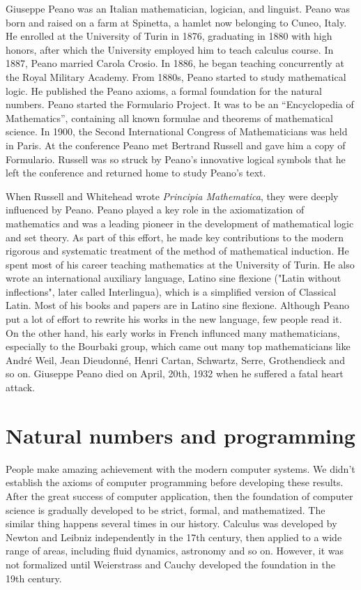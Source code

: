 \documentclass[b5paper]{article}
\begin{document}
Giuseppe Peano was an Italian mathematician, logician, and linguist. Peano was born and raised on a farm at Spinetta, a hamlet now belonging to Cuneo, Italy. He enrolled at the University of Turin in 1876, graduating in 1880 with high honors, after which the University employed him to teach calculus course. In 1887, Peano married Carola Crosio. In 1886, he began teaching concurrently at the Royal Military Academy. From 1880s, Peano started to study mathematical logic. He published the Peano axioms, a formal foundation for the natural numbers. Peano started the Formulario Project. It was to be an ``Encyclopedia of Mathematics'', containing all known formulae and theorems of mathematical science. In 1900, the Second International Congress of Mathematicians was held in Paris. At the conference Peano met Bertrand Russell and gave him a copy of Formulario. Russell was so struck by Peano's innovative logical symbols that he left the conference and returned home to study Peano's text\cite{M-Kline-2007}.

When Russell and Whitehead wrote {\em Principia Mathematica}, they were deeply influenced by Peano. Peano played a key role in the axiomatization of mathematics and was a leading pioneer in the development of mathematical logic and set theory. As part of this effort, he made key contributions to the modern rigorous and systematic treatment of the method of mathematical induction. He spent most of his career teaching mathematics at the University of Turin. He also wrote an international auxiliary language, Latino sine flexione ("Latin without inflections", later called Interlingua), which is a simplified version of Classical Latin. Most of his books and papers are in Latino sine flexione. Although Peano put a lot of effort to rewrite his works in the new language, few people read it. On the other hand, his early works in French influnced many mathematicians, especially to the Bourbaki group, which came out many top mathematicians like André Weil, Jean Dieudonné, Henri Cartan, Schwartz, Serre, Grothendieck and so on. Giuseppe Peano died on April, 20th, 1932 when he suffered a fatal heart attack.

\section{Natural numbers and programming}

People make amazing achievement with the modern computer systems. We didn't establish the axioms of computer programming before developing these results. After the great success of computer application, then the foundation of computer science is gradually developed to be strict, formal, and mathematized. The similar thing happens several times in our history. Calculus was developed by Newton and Leibniz independently in the 17th century, then applied to a wide range of areas, including fluid dynamics, astronomy and so on. However, it was not formalized until Weierstrass and Cauchy developed the foundation in the 19th century\cite{M-Kline-2007}.
\end{document}
